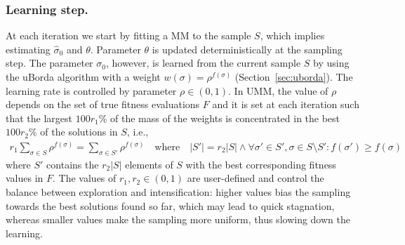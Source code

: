 \documentclass[runningheads]{llncs}
\begin{document}
\newcommand{\Edist}{\ensuremath{\mathbb{E}[D]}}


\subsubsection{Learning step.}
At each iteration we start by fitting a MM to the sample $S$, which implies
estimating $\hat\sigma_0$ and $\theta$. Parameter $\theta$ is updated
deterministically at the sampling step.  The parameter $\sigma_0$, however, is
learned from the current sample $S$ by using the uBorda algorithm with a weight
$w(\sigma)=\rho^{f(\sigma)}$ (Section~\ref{sec:uborda}). The learning rate is
controlled by parameter $\rho \in (0,1)$. %
In UMM, the value of $\rho$ depends on the set of true fitness evaluations $F$
and it is set at each iteration such that the largest $100r_1$\% of the mass of
the weights is concentrated in the best $100r_2$\% of the solutions in $S$, i.e.,
%
\begin{equation}
\begin{split}
r_1 \sum_{\sigma\in S}\rho^{f(\sigma)} =  \sum_{\sigma\in S'}\rho^{f(\sigma)} \quad\text{where}\quad |S'| = r_2|S| \land \forall \sigma'\in S', \sigma\in S\setminus S' : f(\sigma')\geq f(\sigma)
\end{split}
\end{equation}
%
where $S'$ contains the $r_2|S|$ elements of $S$ with the best corresponding fitness values in $F$. The values of $r_1, r_2 \in (0, 1)$ are user-defined and control the balance between exploration and intensification: higher values bias the sampling towards the best solutions found so far, which may lead to quick stagnation, whereas smaller values make the sampling more uniform, thus slowing down the learning.



\end{document}

